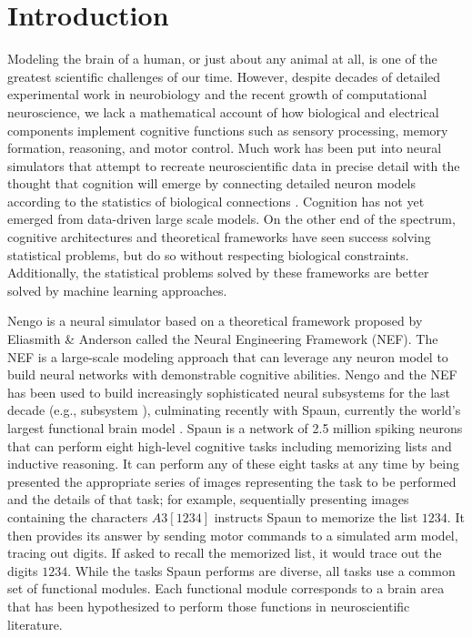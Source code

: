 \documentclass{frontiersSCNS}
\begin{document}
\section{Introduction}

Modeling the brain of a human,
or just about any animal at all,
is one of the greatest
scientific challenges of our time.
However, despite decades of detailed
experimental work in neurobiology
and the recent growth of computational neuroscience,
we lack a mathematical account of
how biological and electrical components
implement cognitive functions such as sensory processing,
memory formation, reasoning, and motor control.
Much work has been put into neural simulators
that attempt to recreate neuroscientific
data in precise detail with the thought that
cognition will emerge by connecting
detailed neuron models according
to the statistics of biological connections \cite{TODO}. %
Cognition has not yet emerged
from data-driven large scale models.
On the other end of the spectrum,
cognitive architectures \cite{TODO} %
and theoretical frameworks \cite{TODO} %
have seen success solving statistical problems,
but do so without respecting biological constraints.
Additionally, the statistical problems
solved by these frameworks are better solved
by machine learning approaches.

Nengo is a neural simulator
based on a theoretical framework proposed
by Eliasmith \& Anderson \citeyearpar{TODO}
called the Neural Engineering Framework
(NEF).
The NEF is a large-scale modeling approach
that can leverage any neuron model
to build neural networks with
demonstrable cognitive abilities.
Nengo and the NEF has been used to build
increasingly sophisticated neural subsystems
for the last decade (e.g., subsystem \cite{TODO}),
culminating recently with Spaun,
currently the world's
largest functional brain model \cite{TODO}.
Spaun is a network of 2.5 million spiking neurons
that can perform eight high-level cognitive tasks
including memorizing lists and inductive reasoning.
It can perform any of these eight tasks
at any time by being presented
the appropriate series of images
representing the task to be performed
and the details of that task;
for example, sequentially presenting images
containing the characters $A3[1234]$ instructs Spaun
to memorize the list $1234$.
It then provides its answer by
sending motor commands to a simulated arm model,
tracing out digits.
If asked to recall the memorized list,
it would trace out the digits $1234$.
While the tasks Spaun performs are diverse,
all tasks use a common set of
functional modules.
Each functional module corresponds
to a brain area that has been hypothesized
to perform those functions
in neuroscientific literature.
\end{document}
